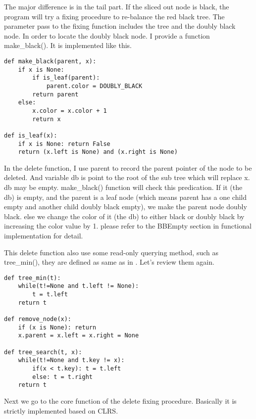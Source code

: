 \documentclass{article}
\begin{document}
The major difference is in the tail part. If the sliced out node is black, the program will
try a fixing procedure to re-balance the red black tree. The parameter pass to the fixing
function includes the tree and the doubly black node. In order to locate the doubly black
node. I provide a function make\_black(). It is implemented like this.

\begin{lstlisting}
def make_black(parent, x):
    if x is None:
        if is_leaf(parent):
            parent.color = DOUBLY_BLACK
        return parent
    else:
        x.color = x.color + 1
        return x

def is_leaf(x):
    if x is None: return False
    return (x.left is None) and (x.right is None)
\end{lstlisting}

In the delete function, I use parent to record the parent pointer of the node to be deleted. 
And variable db is point to the root of the sub tree which will replace x. db may be empty.
make\_black() function will check this predication. If it (the db) is empty, and the parent is a leaf
node (which means parent has a one child empty and another child doubly black empty), we make
the parent node doubly black. else we change the color of it (the db) to either black or doubly
black by increasing the color value by 1. please refer to the BBEmpty section in functional 
implementation for detail.

This delete function also use some read-only querying method, such as tree\_min(), they are defined
as same as in \cite{bst-lxy}. Let's review them again.

\begin{lstlisting}
def tree_min(t):
    while(t!=None and t.left != None):
        t = t.left
    return t

def remove_node(x):
    if (x is None): return
    x.parent = x.left = x.right = None

def tree_search(t, x):
    while(t!=None and t.key != x):
        if(x < t.key): t = t.left
        else: t = t.right
    return t
\end{lstlisting}

Next we go to the core function of the delete fixing procedure. Basically it is strictly implemented
based on CLRS.
\end{document}
